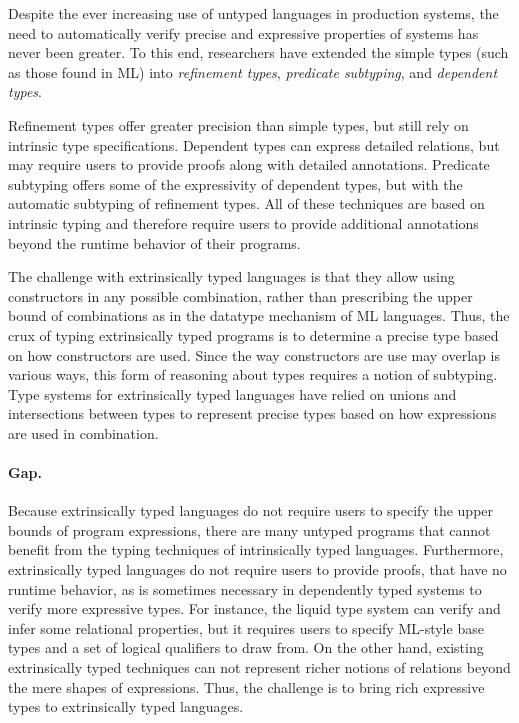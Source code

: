 \documentclass[acmsmall]{acmart}
\begin{document}
Despite the ever increasing use of untyped languages in production systems, 
the need to automatically verify precise and expressive properties of systems has never been greater.
To this end, researchers have extended the simple types (such as those found in ML) into 
\textit{refinement types}, \textit{predicate subtyping}, and \textit{dependent types}. 

Refinement types offer greater precision than simple types, but still rely on intrinsic type specifications.
Dependent types can express detailed relations, but may require users to provide proofs along with detailed annotations.
Predicate subtyping offers some of the expressivity of dependent types, but with the automatic subtyping of refinement types.
All of these techniques are based on intrinsic typing and therefore require users to provide additional annotations
beyond the runtime behavior of their programs.

The challenge with extrinsically typed languages is that they allow using constructors
in any possible combination, rather than prescribing the upper bound of combinations as in
the datatype mechanism of ML languages. Thus, the crux of typing extrinsically typed programs is
to determine a precise type based on how constructors are used. 
Since the way constructors are use may overlap is various ways, this form of reasoning about types
requires a notion of subtyping.
Type systems for extrinsically typed languages have relied on unions and intersections between types to 
represent precise types based on how expressions are used in combination. 

\paragraph{Gap.} 
Because extrinsically typed languages do not require users to specify the upper bounds of program expressions,
there are many untyped programs that cannot benefit from the typing techniques of 
intrinsically typed languages. Furthermore, extrinsically typed languages do not require users to provide proofs,
that have no runtime behavior, as is sometimes necessary in dependently typed systems to verify more expressive types.   
For instance, the liquid type system \cite{} can verify and infer some relational properties, 
but it requires users to specify ML-style base types and a set of logical qualifiers to draw from.
On the other hand, existing extrinsically typed techniques can not represent richer notions of relations 
beyond the mere shapes of expressions.
Thus, the challenge is to bring rich expressive types to extrinsically typed languages.
\end{document}
